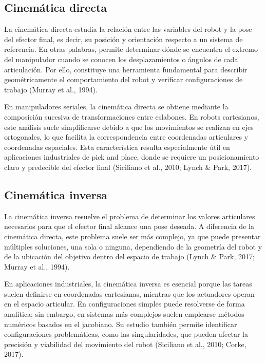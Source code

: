 \subsection{Cinemática directa}
La cinemática directa estudia la relación entre las variables del robot y la pose del efector final, es decir, su posición y orientación respecto a un sistema de referencia. En otras palabras, permite determinar dónde se encuentra el extremo del manipulador cuando se conocen los desplazamientos o ángulos de cada articulación. Por ello, constituye una herramienta fundamental para describir geométricamente el comportamiento del robot y verificar configuraciones de trabajo (Murray et al., 1994).

En manipuladores seriales, la cinemática directa se obtiene mediante la composición sucesiva de transformaciones entre eslabones. En robots cartesianos, este análisis suele simplificarse debido a que los movimientos se realizan en ejes ortogonales, lo que facilita la correspondencia entre coordenadas articulares y coordenadas espaciales. Esta característica resulta especialmente útil en aplicaciones industriales de pick and place, donde se requiere un posicionamiento claro y predecible del efector final (Siciliano et al., 2010; Lynch \& Park, 2017).

\subsection{Cinemática inversa}
La cinemática inversa resuelve el problema de determinar los valores articulares necesarios para que el efector final alcance una pose deseada. A diferencia de la cinemática directa, este problema suele ser más complejo, ya que puede presentar múltiples soluciones, una sola o ninguna, dependiendo de la geometría del robot y de la ubicación del objetivo dentro del espacio de trabajo (Lynch \& Park, 2017; Murray et al., 1994).

En aplicaciones industriales, la cinemática inversa es esencial porque las tareas suelen definirse en coordenadas cartesianas, mientras que los actuadores operan en el espacio articular. En configuraciones simples puede resolverse de forma analítica; sin embargo, en sistemas más complejos suelen emplearse métodos numéricos basados en el jacobiano. Su estudio también permite identificar configuraciones problemáticas, como las singularidades, que pueden afectar la precisión y viabilidad del movimiento del robot (Siciliano et al., 2010; Corke, 2017).



